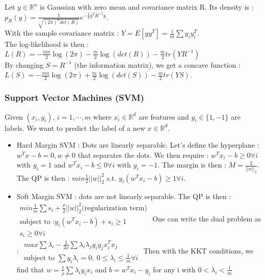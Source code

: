 \documentclass[../main.tex]{subfiles}
\begin{document}
Let $y \in \mathbb{R}^n$ is Gaussian with zero mean and covariance matrix R. Its density is : $p_R(y) = \frac{1}{\sqrt{(2\pi)^n det(R)}} e^{-\frac{1}{2} y^T R^{-1} y}$.\\
With the sample covariance matrix : $Y = E[yy^T] = \frac{1}{m} \sum y_i y_i^T$.\\

The log-likelihood is then : $L(R) = -\frac{mn}{2} \log(2\pi) - \frac{m}{2} \log(det(R)) -\frac{m}{2} tr(YR^{-1})$\\
By changing $S = R^{-1}$ (the information matrix), we get a concave function : $L(S) = -\frac{mn}{2} \log(2\pi) + \frac{m}{2} \log(det(S)) - \frac{m}{2} tr(YS)$.\\

\subsubsection{Support Vector Machines (SVM)}
Given $(x_i, y_i)$, $i=1,\cdots, m$ where $x_i \in \mathbb{R}^d$ are features and $y_i \in \{1, -1\}$ are labels. We want to predict the label of a new $x\in \mathbb{R}^d$.\\

\begin{itemize}
    \item Hard Margin SVM : Dots are linearly separable. Let's define the hyperplane : $w^T x - b= 0, w \neq 0$ that separates the dots. We then require : $w^T x_i - b \geq 0 \forall i $ with $y_i = 1$ and $w^T x_i-b \leq 0 \forall i$ with $y_i = -1$. The margin is then : $M= \frac{2}{\lvert \lvert w \rvert \rvert_2}$. The QP is then : $min \frac{1}{2} \lvert\lvert w \rvert\rvert_2^2$ s.t. $y_i(w^T x_i - b) \geq 1 \forall i$.\\
    \item Soft Margin SVM : dots are not linearly separable.
    The QP is then : $\begin{matrix}
        min \frac{1}{m} \sum s_i + \frac{\rho}{2} \lvert \lvert w \rvert \rvert_2^2 \text{(regularization term)}\\
        \text{subject to :} y_i (w^T x_i - b) + s_i \geq 1\\
        s_i \geq 0 \forall i
    \end{matrix}$
    One can write the dual problem as : $\begin{matrix}
        max \sum \lambda_i - \frac{1}{2\rho} \sum \lambda_i \lambda_j y_i y_j x_i^T x_j\\
        \text{subject to } \sum y_i \lambda_i = 0, \: 0\leq \lambda_i \leq \frac{1}{m} \forall i
    \end{matrix}$
    Then with the KKT conditions, we find that $w = \frac{1}{\rho} \sum \lambda_i y_i x_i$
 and $b = w^T x_i - y_i $ for any i with $0 < \lambda_i < \frac{1}{m}$
 \end{itemize}
 
\end{document}
